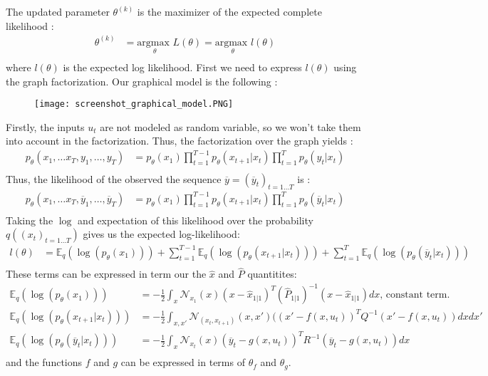 The updated parameter $\theta^{(k)}$ is the maximizer of the expected complete likelihood :
\begin{align*}
  \theta^{(k)} &= \underset{\theta}{\text{argmax }}L(\theta) = \underset{\theta}{\text{argmax }}l(\theta)\\
\end{align*}
where $l(\theta)$ is the expected log likelihood.
First we need to express $l(\theta)$ using the graph factorization.
Our graphical model is the following :
\begin{figure}[H]
	\texttt{[image: screenshot\_graphical\_model.PNG]}
\end{figure}
Firstly, the inputs $u_t$ are not modeled as random variable, so we won't take them into account in the factorization.
Thus, the factorization over the graph yields :
\begin{align*}
p_{\theta}(x_1, \ldots x_T, y_1, \ldots , y_T) &= p_{\theta}(x_1) \prod_{t=1}^{T-1}{p_{\theta}(x_{t+1}|x_t)} \prod_{t=1}^{T}{p_{\theta}(y_t|x_t)}\\
\end{align*}
Thus, the likelihood of the observed the sequence $\overline{y} = (\overline{y}_t)_{t=1 \ldots T}$ is :
\begin{align*}
  p_{\theta}(x_1, \ldots x_T, \overline{y}_1, \ldots , \overline{y}_T) &= p_{\theta}(x_1) \prod_{t=1}^{T-1}{p_{\theta}(x_{t+1}| x_t)} \prod_{t=1}^{T}{p_{\theta}(\overline{y}_t | x_t)}\\
\end{align*}
Taking the $\log$ and expectation of this likelihood over the probability $q \left( (x_t)_{t=1 \ldots T} \right)$ gives us the expected log-likelihood:
\begin{align*}
  l(\theta) & =
    \mathbb{E}_q(\log(p_{\theta}(x_1))) +
    \sum_{t=1}^{T-1}{\mathbb{E}_q \left( \log(p_{\theta}(x_{t+1}|x_t)) \right)} +
    \sum_{t=1}^{T}{\mathbb{E}_q\left( \log(p_{\theta}(\overline{y}_t|x_t)) \right)}\nonumber \\
\end{align*}
These terms can be expressed in term our the $\hat{x}$ and $\hat{P}$ quantitites:
\begin{align*}
  \mathbb{E}_q(\log(p_{\theta}(x_1))) &= -\frac{1}{2}\int_x{\mathcal{N}_{x_1}(x) (x - \hat{x}_{1|1})^T (\hat{P}_{1|1})^{-1} (x - \hat{x}_{1|1}) dx}\text{, constant term.}\\
  \mathbb{E}_q \left( \log(p_{\theta}(x_{t+1}|x_t)) \right) &= -\frac{1}{2}\int_{x,x'}{\mathcal{N}_{(x_t,x_{t+1})}(x, x') ((x' - f(x,u_t))^T Q^{-1} (x' - f(x,u_t)) dxdx'}\\
  \mathbb{E}_q\left( \log(p_{\theta}(\overline{y}_t|x_t)) \right) &= -\frac{1}{2}\int_x{\mathcal{N}_{x_t}(x) (\overline{y}_t - g(x, u_t))^T R^{-1} (\overline{y}_t - g(x, u_t)) dx}\\
\end{align*}
and the functions $f$ and $g$ can be expressed in terms of $\theta_f$ and $\theta_g$.\\

